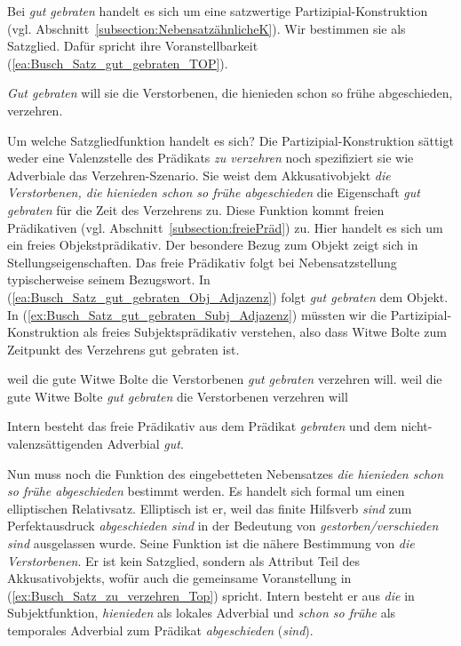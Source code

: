 Bei \textit{gut gebraten} handelt es sich um eine satzwertige Partizipial-Konstruktion (vgl. Abschnitt~\ref{subsection:NebensatzähnlicheK}). Wir bestimmen sie als Satzglied. Dafür spricht ihre Voranstellbarkeit (\ref{ea:Busch_Satz_gut_gebraten_TOP}).

\ea \label{ea:Busch_Satz_gut_gebraten_TOP} \textit{Gut gebraten} will sie die Verstorbenen, die hienieden schon so frühe abgeschieden, verzehren.
\z 

Um welche Satzgliedfunktion handelt es sich? Die Partizipial-Konstruktion sättigt weder eine Valenzstelle des Prädikats \textit{zu verzehren} noch spezifiziert sie wie Adverbiale das Verzehren-Szenario. Sie weist dem Akkusativobjekt \textit{die Verstorbenen, die hienieden schon so frühe abgeschieden} die Eigenschaft \textit{gut gebraten} für die Zeit des Verzehrens zu. Diese Funktion kommt freien Prädikativen (vgl. Abschnitt~\ref{subsection:freiePräd}) zu. Hier handelt es sich um ein freies Objekstprädikativ. Der besondere Bezug zum Objekt zeigt sich in Stellungseigenschaften. Das freie Prädikativ folgt bei Nebensatzstellung typischerweise seinem Bezugswort. In (\ref{ea:Busch_Satz_gut_gebraten_Obj_Adjazenz}) folgt \textit{gut gebraten} dem Objekt. In (\ref{ex:Busch_Satz_gut_gebraten_Subj_Adjazenz}) müssten wir die Partizipial-Konstruktion als freies Subjektsprädikativ verstehen, also dass Witwe Bolte zum Zeitpunkt des Verzehrens gut gebraten ist.

\ea \label{ea:Busch_Satz_gut_gebraten_FP}
\ea \label{ea:Busch_Satz_gut_gebraten_Obj_Adjazenz} weil die gute Witwe Bolte die Verstorbenen \textit{gut gebraten} verzehren will.
\ex \label{ex:Busch_Satz_gut_gebraten_Subj_Adjazenz} weil die gute Witwe Bolte \textit{gut gebraten} die Verstorbenen verzehren will
\z 
\z 

Intern besteht das freie Prädikativ aus dem Prädikat \textit{gebraten} und dem nicht-valenzsättigenden Adverbial \textit{gut}.

Nun muss noch die Funktion des eingebetteten Nebensatzes \textit{die hienieden schon so frühe abgeschieden} bestimmt werden. Es handelt sich formal um einen elliptischen Relativsatz. Elliptisch ist er, weil das finite Hilfsverb \textit{sind} zum Perfektausdruck \textit{abgeschieden sind} in der Bedeutung von \textit{gestorben/verschieden sind} ausgelassen wurde. Seine Funktion ist die nähere Bestimmung von \textit{die Verstorbenen}. Er ist kein Satzglied, sondern als Attribut Teil des Akkusativobjekts, wofür auch die gemeinsame Voranstellung in (\ref{ex:Busch_Satz_zu_verzehren_Top}) spricht. Intern besteht er aus \textit{die} in Subjektfunktion, \textit{hienieden} als lokales Adverbial und \textit{schon so frühe} als temporales Adverbial zum Prädikat \textit{abgeschieden} (\textit{sind}). 

